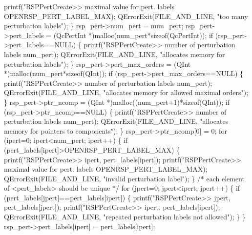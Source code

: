         printf("RSPPertCreate>> maximal value for pert. labels %
               OPENRSP_PERT_LABEL_MAX);
        QErrorExit(FILE_AND_LINE, "too many perturbation labels");
    \}
    rsp_pert->num_pert = num_pert;
    rsp_pert->pert_labels = (QcPertInt *)malloc(num_pert*sizeof(QcPertInt));
    if (rsp_pert->pert_labels==NULL) \{
        printf("RSPPertCreate>> number of perturbation labels %
               num_pert);
        QErrorExit(FILE_AND_LINE, "allocates memory for perturbation labels");
    \}
    rsp_pert->pert_max_orders = (QInt *)malloc(num_pert*sizeof(QInt));
    if (rsp_pert->pert_max_orders==NULL) \{
        printf("RSPPertCreate>> number of perturbation labels %
               num_pert);
        QErrorExit(FILE_AND_LINE, "allocates memory for allowed maximal orders");
    \}
    rsp_pert->ptr_ncomp = (QInt *)malloc((num_pert+1)*sizeof(QInt));
    if (rsp_pert->ptr_ncomp==NULL) \{
        printf("RSPPertCreate>> number of perturbation labels %
               num_pert);
        QErrorExit(FILE_AND_LINE, "allocates memory for pointers to components");
    \}
    rsp_pert->ptr_ncomp[0] = 0;
    for (ipert=0; ipert<num_pert; ipert++) \{
        if (pert_labels[ipert]>OPENRSP_PERT_LABEL_MAX) \{
            printf("RSPPertCreate>> %
                   ipert,
                   pert_labels[ipert]);
            printf("RSPPertCreate>> maximal value for pert. labels %
                   OPENRSP_PERT_LABEL_MAX);
            QErrorExit(FILE_AND_LINE, "invalid perturbation label");
        \}
        /* each element of <pert_labels> should be unique */
        for (jpert=0; jpert<ipert; jpert++) \{
            if (pert_labels[jpert]==pert_labels[ipert]) \{
                printf("RSPPertCreate>> %
                       jpert,
                       pert_labels[jpert]);
                printf("RSPPertCreate>> %
                       ipert,
                       pert_labels[ipert]);
                QErrorExit(FILE_AND_LINE, "repeated perturbation labels not allowed");
            \}
        \}
        rsp_pert->pert_labels[ipert] = pert_labels[ipert];
